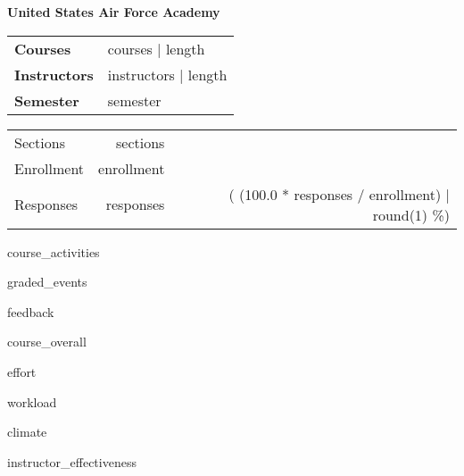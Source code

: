 \documentclass{article}
\begin{document}
{\bfseries\large United States Air Force Academy}

\smallskip  %
\begin{minipage}{0.67\linewidth}
  \begin{tabular}{@{}>{\bfseries}ll}
    Courses & {{ courses | length }}\\
    Instructors & {{ instructors | length }}\\
    Semester & {{ semester }}\\
  \end{tabular}
\end{minipage}%
\begin{minipage}{0.33\linewidth}
  \hfill  %
  \begin{tabular}{l rr@{}}
    Sections & {{ sections }}\\
    Enrollment & {{ enrollment }}\\
    Responses & {{ responses }} & ({{ (100.0 * responses / enrollment) | round(1) }}\%)\\
  \end{tabular}
\end{minipage}
\medskip  %

{{ course_activities }}

\clearpage  %
{{ graded_events }}

\clearpage  %
{{ feedback }}

\clearpage  %
{{ course_overall }}

\clearpage  %
{{ effort }}

\clearpage  %
{{ workload }}

\clearpage  %
{{ climate }}

\clearpage  %
{{ instructor_effectiveness }}

\clearpage  %
\end{document}
